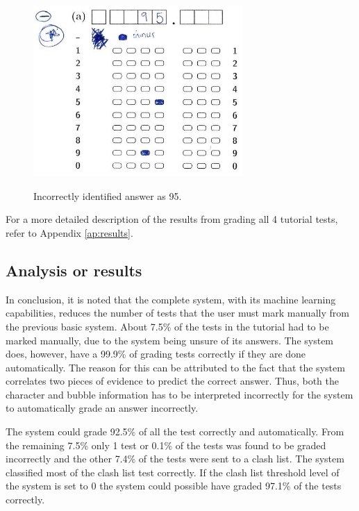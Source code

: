 \begin{figure}
  \centering
  \includegraphics[width=8cm]{wrongResult}\\
  \caption{Incorrectly identified answer as 95.}
  \label{fig:wrongAns}
\end{figure}

For a more detailed description of the results from grading all 4 tutorial tests, refer to Appendix \ref{ap:results}.

\subsection{Analysis or results}

In conclusion, it is noted that the complete system, with its machine learning capabilities, reduces the number of tests that the user must mark manually from the previous basic system. About 7.5\% of the tests in the tutorial had to be marked manually, due to the system being unsure of its answers. The system does, however, have a 99.9\% of grading tests correctly if they are done automatically. The reason for this can be attributed to the fact that the system correlates two pieces of evidence to predict the correct answer. Thus, both the character and bubble information has to be interpreted incorrectly for the system to automatically grade an answer incorrectly. 

The system could grade 92.5\% of all the test correctly and automatically. From the remaining 7.5\% only 1 test or 0.1\% of the tests was found to be graded incorrectly and the other 7.4\% of the tests were sent to a clash list. The system classified most of the clash list test correctly. If the clash list threshold level of the system is set to 0 the system could possible have graded 97.1\% of the tests correctly.

